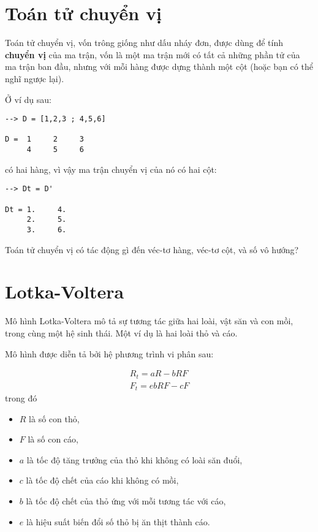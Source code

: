 \documentclass[12pt]{book}
\begin{document}
\section{Toán tử chuyển vị}

Toán tử chuyển vị, vốn trông giống như dấu nháy đơn, được dùng để
tính {\bf chuyển vị} của ma trận, vốn là một ma trận mới có tất cả
những phần tử của ma trận ban đầu, nhưng với mỗi hàng được
dựng thành một cột (hoặc bạn có thể nghĩ ngược lại).

Ở ví dụ sau:

\begin{verbatim}
--> D = [1,2,3 ; 4,5,6]

D =  1     2     3
     4     5     6
\end{verbatim}
%
 có hai hàng, vì vậy ma trận chuyển vị của nó có
hai cột:

\begin{verbatim}
--> Dt = D'

Dt = 1.     4.
     2.     5.
     3.     6.
\end{verbatim}
%
\begin{ex}
Toán tử chuyển vị có tác động gì đến véc-tơ hàng, véc-tơ cột, và
số vô hướng?
\end{ex}


\section{Lotka-Voltera}
\label{lotka}

Mô hình Lotka-Voltera mô tả sự tương tác giữa hai loài, vật săn và con
mồi, trong cùng một hệ sinh thái. Một ví dụ là hai loài thỏ và cáo.

Mô hình được diễn tả bởi hệ phương trình vi phân sau:

\begin{eqnarray*}
R_t = a R - b R F \\
F_t = e b R F - c F
\end{eqnarray*}
%
\noindent trong đó
%
\begin{itemize}
%
\item $R$ là số con thỏ,
\item $F$ là số con cáo,
\item $a$ là tốc độ tăng trưởng của thỏ khi không có loài săn đuổi,
\item $c$ là tốc độ chết của cáo khi không có mồi,
\item $b$ là tốc độ chết của thỏ ứng với mỗi tương tác với cáo,
\item $e$ là hiệu suất biến đổi số thỏ bị ăn thịt thành cáo.
%
\end{itemize}
\end{document}
